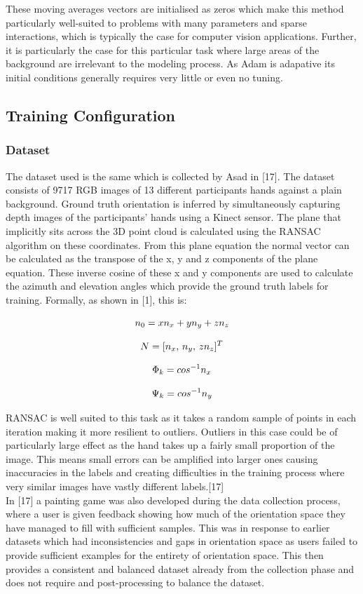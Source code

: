 \documentclass{article}
\begin{document}
These moving averages vectors are initialised as zeros which make this method particularly well-suited to problems with many parameters and sparse interactions, which is typically the case for computer vision applications. Further, it is particularly the case for this particular task where large areas of the background are irrelevant to the modeling process. As Adam is adapative its initial conditions generally requires very little or even no tuning.
\subsection{Training Configuration}
\subsubsection{Dataset}
The dataset used is the same which is collected by Asad in [17]. The dataset consists of 9717 RGB images of 13 different participants hands against a plain background. Ground truth orientation is inferred by simultaneously capturing depth images of the participants' hands using a Kinect sensor. The plane that implicitly sits across the 3D point cloud is calculated using the RANSAC algorithm on these coordinates. From this plane equation the normal vector can be calculated as the transpose of the x, y and z components of the plane equation. These inverse cosine of these x and y components are used to calculate the azimuth and elevation angles which provide the ground truth labels for training. Formally, as shown in [1], this is:

\[\emph{$n_{0}$} =  \emph{$xn_{x}$} + \emph{$yn_{y}$} + \emph{$zn_{z}$}\]

\[\emph{$N$} =  [\emph{$n_{x}$},\, \emph{$n_{y}$},\, \emph{$zn_{z}$}]^T\]

\[\emph{$\Phi_{k}$} =  \emph{$cos^{-1}n_{x}$}\]

\[\emph{$\Psi_{k}$} =  \emph{$cos^{-1}n_{y}$}\]

RANSAC is well suited to this task as it takes a random sample of points in each iteration making it more resilient to outliers. Outliers in this case could be of particularly large effect as the hand takes up a fairly small proportion of the image. This means small errors can be amplified into larger ones causing inaccuracies in the labels and creating difficulties in the training process where very similar images have vastly different labels.[17]\\

In [17] a painting game was also developed during the data collection process, where a user is given feedback showing how much of the orientation space they have managed to fill with sufficient samples. This was in response to earlier datasets which had inconsistencies and gaps in orientation space as users failed to provide sufficient examples for the entirety of orientation space. This then provides a consistent and balanced dataset already from the collection phase and does not require and post-processing to balance the dataset.
\end{document}
